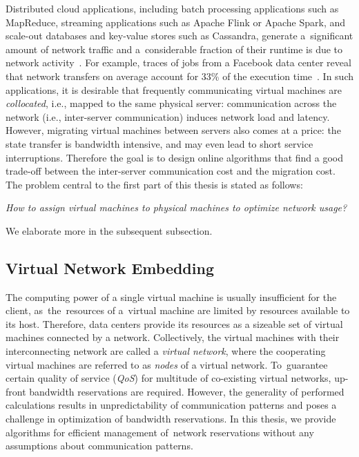 Distributed cloud applications, including batch processing
applications such as MapReduce, streaming applications such as Apache Flink or
Apache Spark, and scale-out databases and key-value stores such as Cassandra,
generate a~significant amount of network traffic and a~considerable fraction
of their runtime is due to network activity~\cite{MogPop12}. For example,
traces of jobs from a Facebook data center reveal that network transfers on
average account for 33\% of the execution time~\cite{orchestra}. In such
applications, it is desirable that frequently communicating virtual machines
are \emph{collocated}, i.e., mapped to the same physical server: 
communication across the network (i.e., inter-server communication) induces
network load and latency. However, migrating virtual machines between servers
also comes at a price: the state transfer is bandwidth intensive, and may even
lead to short service interruptions. Therefore the goal is to design online
algorithms that find a good trade-off between the inter-server communication
cost and the migration cost.
%
The problem central to the first part of this thesis is stated as follows:

\begin{center}
  \emph{How to assign virtual machines to physical machines to optimize network
  usage?}
\end{center}
We elaborate more in the subsequent subsection.

\subsection{Virtual Network Embedding}
\label{sec:virt_net_emb}

The computing power of a single virtual machine is usually insufficient for the client, as~the~resources of a~virtual machine are limited by resources available to its host.
Therefore, data centers provide its resources as a sizeable set of virtual machines connected by a network.
Collectively, the virtual machines with their interconnecting network are called a \emph{virtual network}, where the cooperating virtual machines are referred to as \emph{nodes} of a virtual network.
To~guarantee certain quality of service (\emph{QoS}) for multitude of co-existing virtual networks, up-front bandwidth reservations are required.
However, the generality of performed calculations results in unpredictability of communication patterns and poses a challenge in optimization of bandwidth reservations.
In this thesis, we provide algorithms for efficient management of~network reservations without any assumptions about communication patterns.

